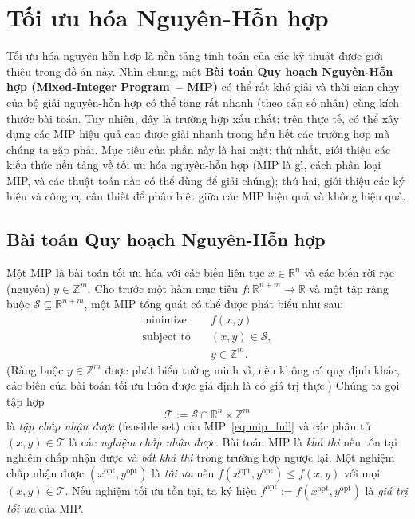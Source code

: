 
\section{Tối ưu hóa Nguyên-Hỗn hợp}
\label{sec:mip_background}

Tối ưu hóa nguyên-hỗn hợp là nền tảng tính toán của các kỹ thuật được giới thiệu trong đồ án này.
Nhìn chung, một \textbf{Bài toán Quy hoạch Nguyên-Hỗn hợp (Mixed-Integer Program~-- MIP)} có thể rất khó
giải và thời gian chạy của bộ giải nguyên-hỗn hợp có thể tăng rất nhanh (theo cấp số nhân) cùng kích thước
bài toán.
Tuy nhiên, đây là trường hợp xấu nhất; trên thực tế, có thể xây dựng các MIP hiệu quả cao
được giải nhanh trong hầu hết các trường hợp mà chúng ta gặp phải.
Mục tiêu của phần này là hai mặt: thứ nhất, giới thiệu các kiến thức nền tảng về tối ưu hóa
nguyên-hỗn hợp (MIP là gì, cách phân loại MIP, và các thuật toán nào có thể dùng để giải chúng);
thứ hai, giới thiệu các ký hiệu và công cụ cần thiết để phân biệt giữa các MIP hiệu quả và không hiệu quả.

\subsection{Bài toán Quy hoạch Nguyên-Hỗn hợp}

Một MIP là bài toán tối ưu hóa với các biến liên tục $x \in \mathbb{R}^n$ và các biến rời rạc
(nguyên) $y \in \mathbb{Z}^m$.
Cho trước một hàm mục tiêu $f : \mathbb{R}^{n+m} \to \mathbb{R}$ và một tập ràng buộc
$\mathcal{S} \subseteq \mathbb{R}^{n+m}$, một MIP tổng quát có thể được phát biểu như sau:
\begin{subequations}
\label{eq:mip_full}
\begin{align}
\text{minimize} \quad & f(x, y) \label{eq:mip_full_obj}\\
\text{subject to} \quad & (x, y) \in \mathcal{S}, \label{eq:mip_full_con}\\
& y \in \mathbb{Z}^m. \label{eq:mip_full_int}
\end{align}
\end{subequations}
(Ràng buộc $y \in \mathbb{Z}^m$ được phát biểu tường minh vì, nếu không có quy định khác, các biến của
bài toán tối ưu luôn được giả định là có giá trị thực.)
Chúng ta gọi tập hợp
\[
\mathcal{T} := \mathcal{S} \cap \mathbb{R}^n \times \mathbb{Z}^m
\]
là \textit{tập chấp nhận được} (feasible set) của MIP~\eqref{eq:mip_full} và các phần tử
$(x, y) \in \mathcal{T}$ là các \textit{nghiệm chấp nhận được}.
Bài toán MIP là \textit{khả thi} nếu tồn tại nghiệm chấp nhận được và \textit{bất khả thi} trong
trường hợp ngược lại.
Một nghiệm chấp nhận được $(x^{\text{opt}}, y^{\text{opt}})$ là \textit{tối ưu} nếu
$f(x^{\text{opt}}, y^{\text{opt}}) \leq f(x, y)$ với mọi $(x, y) \in \mathcal{T}$.
Nếu nghiệm tối ưu tồn tại, ta ký hiệu $f^{\text{opt}} := f(x^{\text{opt}}, y^{\text{opt}})$
là \textit{giá trị tối ưu} của MIP.

